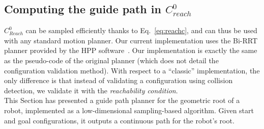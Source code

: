 \documentclass[journal]{IEEEtran}
\newcommand{\deladp}[1]{\deleted[id=adp]{#1}}
\newcommand{\delst}[1]{\deleted[id=st]{#1}}
\newcommand{\gls}[1]{\textit{#1}}
\providecommand{\DIFaddtex}[1]{#1} %
\providecommand{\DIFdeltex}[1]{} %
\providecommand{\DIFaddbegin}{\protect\color{blue}} %
\providecommand{\DIFaddend}{\protect\color{black}} %
\providecommand{\DIFdelbegin}{\protect\cbdelete} %
\providecommand{\DIFdelend}{} %
\providecommand{\DIFadd}[1]{\texorpdfstring{\DIFaddtex{#1}}{#1}} %
\providecommand{\DIFdel}[1]{\texorpdfstring{\DIFdeltex{#1}}{}} %
\begin{document}
\subsection{Computing the guide path in $C_{reach}^0$}
$C_{Reach}^0$ can be sampled efficiently thanks to Eq.~\ref{eq:reachc}, and can thus be used with \DIFdelbegin \DIFdel{a }\DIFdelend \DIFaddbegin \DIFadd{any }\DIFaddend standard motion planner.
\DIFdelbegin \DIFdel{The only significant change is to replace the collision checking with the \textit{reachability condition}.
}\DIFdelend %
Our current implementation \DIFdelbegin \DIFdel{of these modifications is based on }\DIFdelend \DIFaddbegin \DIFadd{uses }\DIFaddend the Bi-RRT planner \citep{770022} provided by the HPP software~\citep{7759083}.
\DIFaddbegin \DIFadd{Our implementation is exactly the same as the pseudo-code of the original planner (which does not detail the configuration validation method). With respect to a ``classic'' implementation, the only difference is that instead of validating a configuration using collision detection, we validate it with the \textit{reachability condition}.}\DIFaddend \\


This Section has presented a guide path planner for the geometric root of a robot, implemented as a low-dimensional sampling-based 
algorithm. Given start and goal configurations, it outputs a continuous path for the robot's root. 
\end{document}
